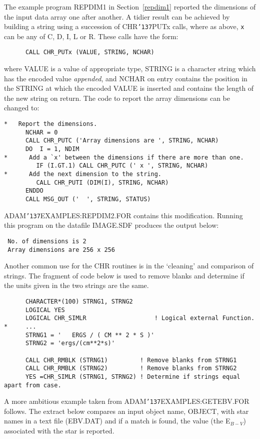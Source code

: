 \documentclass[twoside,11pt]{article}
\renewcommand{\_}{{\tt\char'137}}
\begin{document}
The example program REPDIM1 in Section~\ref{repdim1} reported the dimensions of 
the input data array one after another.
A tidier result can be achieved by building a  string using a succession of
CHR\_PUTx calls, where as above, {\tt x} can be any of C, D, I, L or  R.
These calls have the form:
\begin{verbatim}
      CALL CHR_PUTx (VALUE, STRING, NCHAR)
\end{verbatim}
where VALUE is a value of appropriate type, STRING is a character string which
has the encoded value {\sl appended},  and NCHAR on entry contains the
position in the STRING at which the encoded VALUE is inserted and contains
the length of the new string on return.
The code to report the array dimensions can be changed to:
\begin{verbatim}
*   Report the dimensions.
      NCHAR = 0
      CALL CHR_PUTC ('Array dimensions are ', STRING, NCHAR)
      DO  I = 1, NDIM
*      Add a `x' between the dimensions if there are more than one.
         IF (I.GT.1) CALL CHR_PUTC (' x ', STRING, NCHAR)
*      Add the next dimension to the string.
         CALL CHR_PUTI (DIM(I), STRING, NCHAR)
      ENDDO
      CALL MSG_OUT ('  ', STRING, STATUS) 
\end{verbatim}
ADAM\_EXAMPLES:REPDIM2.FOR contains this modification.
Running this program on the datafile IMAGE.SDF produces the output below:
\begin{verbatim}
 No. of dimensions is 2
 Array dimensions are 256 x 256
\end{verbatim}
Another common use for the CHR routines is in the `cleaning' and
comparison  of strings.
The fragment of code below is used to remove blanks and
determine if the units given in the two strings are the same.
\begin{verbatim}
      CHARACTER*(100) STRNG1, STRNG2
      LOGICAL YES
      LOGICAL CHR_SIMLR                   ! Logical external Function.
*     ...      
      STRNG1 = '   ERGS / ( CM ** 2 * S )'
      STRNG2 = 'ergs/(cm**2*s)'

      CALL CHR_RMBLK (STRNG1)         ! Remove blanks from STRNG1
      CALL CHR_RMBLK (STRNG2)         ! Remove blanks from STRNG2
      YES =CHR_SIMLR (STRNG1, STRNG2) ! Determine if strings equal apart from case.
\end{verbatim}
\newpage
A more ambitious example taken from ADAM\_EXAMPLES:GETEBV.FOR follows.
The  extract below compares an input object name, OBJECT, 
with star names 
in a text file (EBV.DAT) and if a match is found, the 
value (the E$_{B-V}$) associated with the star is reported.
\end{document}
